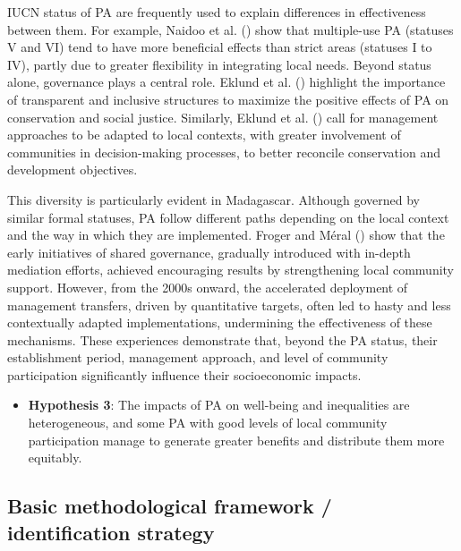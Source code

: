 \documentclass[
]{article}
\providecommand{\tightlist}{%
  \setlength{\itemsep}{0pt}\setlength{\parskip}{0pt}}\usepackage{longtable,booktabs,array}
\begin{document}
IUCN status of PA are frequently used to explain differences in
effectiveness between them. For example, Naidoo et al.
() show that multiple-use PA
(statuses V and VI) tend to have more beneficial effects than strict
areas (statuses I to IV), partly due to greater flexibility in
integrating local needs. Beyond status alone, governance plays a central
role. Eklund et al. () highlight
the importance of transparent and inclusive structures to maximize the
positive effects of PA on conservation and social justice. Similarly,
Eklund et al. () call for
management approaches to be adapted to local contexts, with greater
involvement of communities in decision-making processes, to better
reconcile conservation and development objectives.

This diversity is particularly evident in Madagascar. Although governed
by similar formal statuses, PA follow different paths depending on the
local context and the way in which they are implemented. Froger and
Méral () show that the early
initiatives of shared governance, gradually introduced with in-depth
mediation efforts, achieved encouraging results by strengthening local
community support. However, from the 2000s onward, the accelerated
deployment of management transfers, driven by quantitative targets,
often led to hasty and less contextually adapted implementations,
undermining the effectiveness of these mechanisms. These experiences
demonstrate that, beyond the PA status, their establishment period,
management approach, and level of community participation significantly
influence their socioeconomic impacts.

\begin{itemize}
\tightlist
\item
  \textbf{Hypothesis 3}: The impacts of PA on well-being and
  inequalities are heterogeneous, and some PA with good levels of local
  community participation manage to generate greater benefits and
  distribute them more equitably.
\end{itemize}

\subsection{Basic methodological framework / identification
strategy}\label{basic-methodological-framework-identification-strategy}
\end{document}
